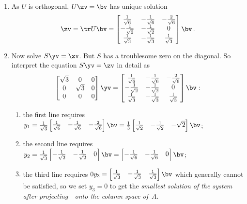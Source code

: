 \begin{example}
\begin{solution}
\begin{enumerate}
\item As \(U\) is orthogonal, \(U\zv=\bv\) has unique solution 
\begin{equation*}
\zv=\tr U\bv=\begin{bmatrix} \frac1{\sqrt6}&-\frac1{\sqrt6}&-\frac2{\sqrt6}
\\-\frac1{\sqrt2}&-\frac1{\sqrt2}&0
\\\frac1{\sqrt3}&-\frac1{\sqrt3}&\frac1{\sqrt3} \end{bmatrix}\bv
\,.
\end{equation*}


\item Now solve \(S\yv=\zv\).
But \(S\) has a troublesome zero on the diagonal. 
So interpret the equation \(S\yv=\zv\) in detail as
\begin{equation*}
\begin{bmatrix} \sqrt3&0&0
\\0&\sqrt3&0
\\0&0&0 \end{bmatrix}\yv=\begin{bmatrix} \frac1{\sqrt6}&-\frac1{\sqrt6}&-\frac2{\sqrt6}
\\-\frac1{\sqrt2}&-\frac1{\sqrt2}&0
\\\frac1{\sqrt3}&-\frac1{\sqrt3}&\frac1{\sqrt3} \end{bmatrix}\bv:
\end{equation*}
\begin{enumerate}\sloppy
\item the first line requires \(y_1=\frac1{\sqrt3}\begin{bmatrix} \frac1{\sqrt6}&-\frac1{\sqrt6}&-\frac2{\sqrt6} \end{bmatrix}\bv
=\frac13\begin{bmatrix} \frac1{\sqrt2}&-\frac1{\sqrt2}&-\sqrt2 \end{bmatrix}\bv\);
\item the second line requires \(y_2=\frac1{\sqrt3}\begin{bmatrix} -\frac1{\sqrt2}&-\frac1{\sqrt2}&0\end{bmatrix}\bv
=\begin{bmatrix} -\frac1{\sqrt6}&-\frac1{\sqrt6}&0\end{bmatrix}\bv\);
\item the third line requires \(0y_3=\begin{bmatrix} \frac1{\sqrt3}&-\frac1{\sqrt3}&\frac1{\sqrt3} \end{bmatrix}\bv\) which generally cannot be satisfied, so we set \(y_3=0\) to get the \emph{smallest solution of the system after projecting~\bv\ onto the column space of~\(A\)}.
\end{enumerate}


\end{enumerate}
\end{solution}
\end{example}
